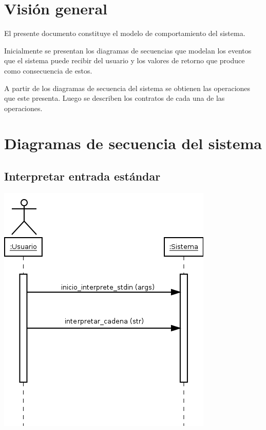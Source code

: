\section{Visión general}
El presente documento constituye el modelo de comportamiento del sistema.

Inicialmente se presentan los diagramas de secuencias que modelan 
los eventos que el sistema puede recibir del usuario y los valores de retorno
que produce como consecuencia de estos.

A partir de los diagramas de secuencia del sistema se obtienen las operaciones 
que este presenta. Luego se describen los contratos de cada una de las operaciones.  
\section{Diagramas de secuencia del sistema}
\subsection{Interpretar entrada estándar}
\begin{center}
\includegraphics[scale=0.4]{interpretar_stdin.png} \\
\end{center}

